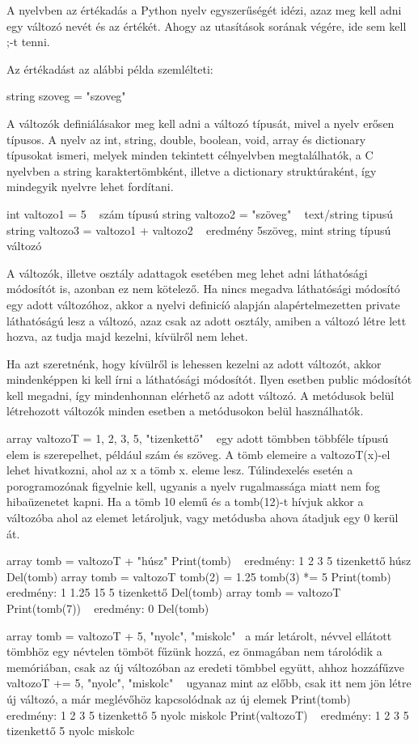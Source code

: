A nyelvben az értékadás a Python nyelv egyszerűségét idézi, azaz meg kell adni egy változó nevét és az értékét. Ahogy az utasítások sorának végére, ide sem kell ;-t tenni.

Az értékadást az alábbi példa szemlélteti:
\begin{cpp}
string szoveg = "szoveg"
\end{cpp}

A változók definiálásakor meg kell adni a változó típusát, mivel a nyelv erősen típusos. A nyelv az int, string, double, boolean, void, array és dictionary típusokat ismeri, melyek minden tekintett célnyelvben megtalálhatók, a C nyelvben a string karaktertömbként, illetve a dictionary struktúraként, így mindegyik nyelvre lehet fordítani.

\begin{cpp}
int valtozo1 = 5 ~ szám típusú
string valtozo2 = "szöveg" ~ text/string tipusú
string valtozo3 = valtozo1 + valtozo2 ~ eredmény 5szöveg, mint string típusú változó
\end{cpp}

A változók, illetve osztály adattagok esetében meg lehet adni láthatósági módosítót is, azonban ez nem kötelező. Ha nincs megadva láthatósági módosító egy adott változóhoz, akkor a nyelvi definicíó alapján alapértelmezetten private láthatóságú lesz a változó, azaz csak az adott osztály, amiben a változó létre lett hozva, az tudja majd kezelni, kívülről nem lehet.

Ha azt szeretnénk, hogy kívülről is lehessen kezelni az adott változót, akkor mindenképpen ki kell írni a láthatósági módosítót. Ilyen esetben public módosítót kell megadni, így mindenhonnan elérhető az adott változó. A metódusok belül létrehozott változók minden esetben a metódusokon belül használhatók.

array valtozoT = {1, 2, 3, 5, "tizenkettő"} ~ egy adott tömbben többféle típusú elem is szerepelhet, például szám és szöveg. A tömb elemeire a valtozoT(x)-el lehet hivatkozni, ahol az x a tömb x. eleme lesz.
Túlindexelés esetén a porogramozónak figyelnie kell, ugyanis a nyelv rugalmassága miatt nem fog hibaüzenetet kapni. Ha a tömb 10 elemű és a tomb(12)-t hívjuk akkor a változóba ahol az elemet letároljuk, vagy metódusba ahova átadjuk egy 0 kerül át.

\begin{cpp}
array tomb = valtozoT + "húsz"
Print(tomb) ~ eredmény: 1 2 3 5 tizenkettő húsz
Del(tomb)
array tomb = valtozoT
tomb(2) = 1.25
tomb(3) *= 5
Print(tomb) ~ eredmény: 1 1.25 15 5 tizenkettő
Del(tomb)
array tomb = valtozoT
Print(tomb(7)) ~ eredmény: 0
Del(tomb)

array tomb = valtozoT + {5, "nyolc", "miskolc"} ~a már letárolt, névvel ellátott tömbhöz egy névtelen tömböt fűzünk hozzá, ez önmagában nem tárolódik a memóriában, csak az új változóban az eredeti tömbbel együtt, ahhoz hozzáfűzve
valtozoT += {5, "nyolc", "miskolc"} ~ ugyanaz mint az előbb, csak itt nem jön létre új változó, a már meglévőhöz kapcsolódnak az új elemek
Print(tomb) ~ eredmény: 1 2 3 5 tizenkettő 5 nyolc miskolc
Print(valtozoT) ~ eredmény: 1 2 3 5 tizenkettő 5 nyolc miskolc
\end{cpp}

